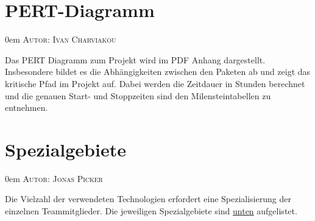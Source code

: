 \documentclass{article}
\makeatletter
\newcommand{\sectionauthor}[1]{
	{\parindent 0em \large \scshape Autor: #1 \par \nobreak \vspace*{1em}}
	\@afterheading
}
\makeatother
\begin{document}
\section{PERT-Diagramm}
\sectionauthor{Ivan Charviakou}

Das PERT Diagramm zum Projekt wird im PDF Anhang dargestellt. 
Insbesondere bildet es die Abhängigkeiten zwischen den Paketen ab und zeigt das kritische Pfad im Projekt auf. 
Dabei werden die Zeitdauer in Stunden berechnet und die genauen Start- und Stoppzeiten sind den Milensteintabellen zu entnehmen.


\section{Spezialgebiete}
\sectionauthor{Jonas Picker}
Die Vielzahl der verwendeten Technologien erfordert eine Spezialisierung der einzelnen Teammitglieder. Die jeweiligen Spezialgebiete sind \hyperlink{speziell}{unten} aufgelistet.
\end{document}
